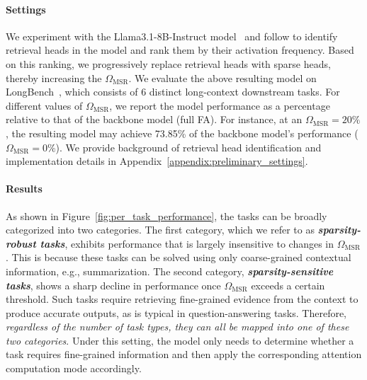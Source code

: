 \paragraph{Settings}
We experiment with the Llama3.1-8B-Instruct model~\citep{grattafiori2024llama} and follow \citet{wu2024retrieval} to identify retrieval heads in the model and rank them by their activation frequency.
Based on this ranking, we progressively replace retrieval heads with sparse heads, thereby increasing the $\Omega_\mathrm{MSR}$.
We evaluate the above resulting model on LongBench~\citep{bai2024longbench}, which consists of 6 distinct long-context downstream tasks.
For different values of $\Omega_\mathrm{MSR}$, we report the model performance as a percentage relative to that of the backbone model (full FA).
For instance, at an $\Omega_\mathrm{MSR}=20\%$, the resulting model may achieve 73.85\% of the backbone model's performance ($\Omega_\mathrm{MSR}=0\%$).
We provide background of retrieval head identification and implementation details in Appendix~\ref{appendix:preliminary_settings}.

\paragraph{Results}
As shown in Figure~\ref{fig:per_task_performance}, the tasks can be broadly categorized into two categories. 
The first category, which we refer to as \emph{\textbf{sparsity-robust tasks}}, exhibits performance that is largely insensitive to changes in $\Omega_\mathrm{MSR}$. 
This is because these tasks can be solved using only coarse-grained contextual information, e.g., summarization.
The second category, \emph{\textbf{sparsity-sensitive tasks}}, shows a sharp decline in performance once $\Omega_\mathrm{MSR}$ exceeds a certain threshold. 
Such tasks require retrieving fine-grained evidence from the context to produce accurate outputs, as is typical in question-answering tasks.
Therefore, \emph{regardless of the number of task types, they can all be mapped into one of these two categories}. 
Under this setting, the model only needs to determine whether a task requires fine-grained information and then apply the corresponding attention computation mode accordingly.
